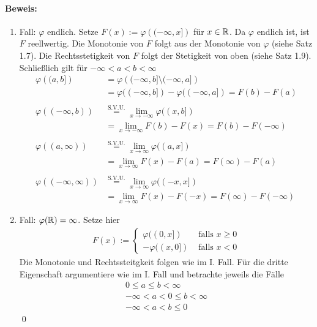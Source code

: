\paragraph{Beweis:} 
\begin{enumerate}[label=\Roman*.]
    \item Fall: $\varphi$ endlich.\newline
    Setze $F(x):=\varphi\left((-\infty,x]\right)$ f\"ur $x\in\mathbb{R}$. Da $\varphi$ endlich ist, ist $F$ reellwertig. Die Monotonie von $F$ folgt aus der Monotonie von $\varphi$ (siehe Satz 1.7). Die Rechtsstetigkeit von $F$ folgt der Stetigkeit von oben (siehe Satz 1.9). Schlie\ss{}lich gilt f\"ur $-\infty<a<b<\infty$
    \begin{align*}
        \varphi\left((a,b]\right)&=\varphi\left((-\infty,b]\setminus(-\infty,a]\right)\\
        &=\varphi((-\infty,b])-\varphi((-\infty,a])=F(b)-F(a)\\ \\
        \varphi((-\infty,b))&\overset{\text{S.V.U.}}{=}\lim_{x\to-\infty}\varphi((x,b])\\
        &=\lim_{x\to-\infty}F(b)-F(x)=F(b)-F(-\infty)\\ \\
        \varphi((a,\infty))&\overset{\text{S.V.U.}}{=}\lim_{x\to\infty}\varphi((a,x])\\
        &=\lim_{x\to\infty}F(x)-F(a)=F(\infty)-F(a) \\ \\
        \varphi((-\infty,\infty))&\overset{\text{S.V.U.}}{=}\lim_{x\to\infty}\varphi((-x,x])\\
        &=\lim_{x\to\infty}F(x)-F(-x)=F(\infty)-F(-\infty)
    \end{align*}
    \item Fall: $\varphi(\mathbb{R})=\infty$.\newline
    Setze hier
    \begin{align*}
        F(x):=
        \begin{cases}
            \varphi((0,x])&\text{ falls }x\geq0 \\
            -\varphi((x,0])&\text{ falls }x<0
        \end{cases}
    \end{align*}
    Die Monotonie und Rechtssteitgkeit folgen wie im I. Fall. F\"ur die dritte Eigenschaft argumentiere wie im I. Fall und betrachte jeweils die F\"alle
    \begin{align*}
        0\leq a\leq b<\infty \\ 
        -\infty<a<0\leq b<\infty \\ 
        -\infty<a<b\leq 0
    \end{align*}
    \qed
\end{enumerate}

